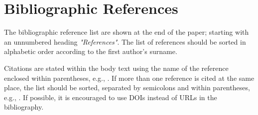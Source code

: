\documentclass[11pt,a4paper,twocolumn]{article}
\renewcommand{\normalsize}{\fontsize{10.5pt}{12.3pt}\selectfont}
\renewcommand{\small}{\fontsize{9.5pt}{11.1pt}\selectfont}
\begin{document}
\section{Bibliographic References}
The bibliographic reference list are shown at the end of the paper;
starting with an unnumbered heading \emph{"References"}. The list of
references should be sorted in alphabetic order according to the first
author's surname. 

Citations are stated within the body text using the name of the
reference enclosed within parentheses, e.g., \citep{Pantelides:1988}. If
more than one reference is cited at the same place, the list should be
sorted, separated by semicolons and within parentheses, e.g.,
\citep{DuffReid:1978,Pierce:2002,Plotkin:1981}. If possible, it is
encouraged to use DOIs instead of URLs in the bibliography. 

\small


\normalsize
\end{document}
